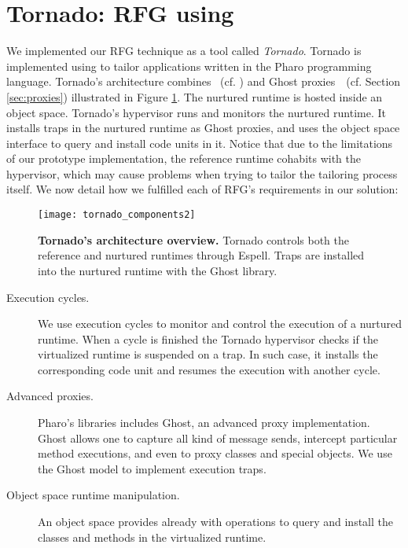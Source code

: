 \section{Tornado: RFG using \Vtt} \label{sec:rfg_implementation}

We implemented our RFG technique as a tool called \emph{Tornado}. Tornado is implemented using \Vtt to tailor applications written in the Pharo programming language.
Tornado's architecture combines \Vtt~(cf. ) and Ghost proxies~\cite{Mart14z}~(cf. Section \ref{sec:proxies}) illustrated in Figure \ref{fig:tornado_code units}. The nurtured runtime is hosted inside an object space. Tornado's hypervisor runs and monitors the nurtured runtime. It installs traps in the nurtured runtime as Ghost proxies, and uses the object space interface to query and install code units in it. Notice that due to the limitations of our prototype implementation, the reference runtime cohabits with the hypervisor, which may cause problems when trying to tailor the tailoring process itself. We now detail how we fulfilled each of RFG's requirements in our solution:

\begin{figure}[ht]
\begin{center}
\texttt{[image: tornado\_components2]}
\caption{\textbf{Tornado's architecture overview.} Tornado controls both the reference and nurtured runtimes through Espell. Traps are installed into the nurtured runtime with the Ghost library.\label{fig:tornado_code units}}
\end{center}
\end{figure}

\begin{description}
\item[Execution cycles.] We use \Vtt execution cycles to monitor and control the execution of a nurtured runtime. When a cycle is finished the Tornado hypervisor checks if the virtualized runtime is suspended on a trap. In such case, it installs the corresponding code unit and resumes the execution with another cycle.

\item[Advanced proxies.] Pharo's libraries includes Ghost, an advanced proxy implementation. Ghost allows one to capture all kind of message sends, intercept particular method executions, and even to proxy classes and special objects. We use the Ghost model to implement execution traps.

\item[Object space runtime manipulation.] An object space provides already with operations to query and install the classes and methods in the virtualized runtime.

\end{description}

